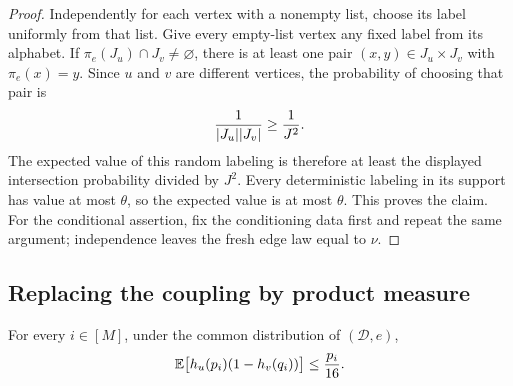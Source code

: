 \begin{proof}
Independently for each vertex with a nonempty list, choose its label
uniformly from that list.  Give every empty-list vertex any fixed
label from its alphabet.  If
\(\pi_e(J_u)\cap J_v\ne\varnothing\), there is at least one pair
\((x,y)\in J_u\times J_v\) with \(\pi_e(x)=y\).  Since \(u\) and
\(v\) are different vertices, the probability of choosing that pair
is
\[
  \frac1{\lvert J_u\rvert\lvert J_v\rvert}\ge\frac1{J^2}.
\]
The expected value of this random labeling is therefore at least
the displayed intersection probability divided by \(J^2\).
Every deterministic labeling in its support has value at most
\(\theta\), so the expected value is at most \(\theta\).
This proves the claim.  For the conditional assertion, fix the
conditioning data first and repeat the same argument; independence
leaves the fresh edge law equal to \(\nu\).
\end{proof}

\subsection{Replacing the coupling by product measure}

\begin{proposition}
\label{prop:product-comparison}
For every \(i\in[M]\), under the common distribution of
\((\mathcal D,e)\),
\begin{equation}
\label{eq:product-comparison}
  \mathbb E\bigl[h_u(p_i)(1-h_v(q_i))\bigr]\le\frac{p_i}{16}.
\end{equation}
\end{proposition}

